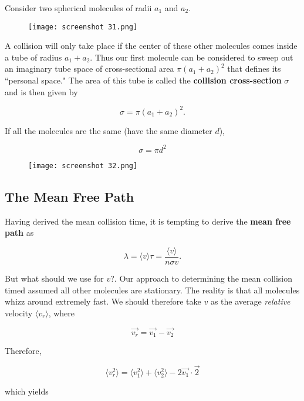 \documentclass[svgnames]{article}     %
\begin{document}
Consider two spherical molecules of radii $a_1$ and $a_2$. 

\begin{figure}[H]
  \centering
    \texttt{[image: screenshot 31.png]}
\end{figure}

A collision will only take place if the center of these other molecules comes
inside a tube of radius $a_1 + a_2$. Thus our first molecule can be considered
to sweep out an imaginary tube space of cross-sectional area $\pi(a_1+a_2)^2$
that defines its ``personal space." The area of this tube is called the
\textbf{collision cross-section} $\sigma$ and is then given by 

\[
\sigma = \pi(a_1 + a_2)^2.
\] \vspace{5px}

If all the molecules are the same (have the same diameter $d$), 

\[
\sigma = \pi d^2
\] \vspace{5px}

\begin{figure}[H]
  \centering
    \texttt{[image: screenshot 32.png]}
\end{figure}

\subsection{The Mean Free Path}

Having derived the mean collision time, it is tempting to derive the
\textbf{mean free path} as 

\[
\lambda = \langle v \rangle \tau = \frac{\langle v \rangle}{n\sigma v}. 
\] \vspace{5px}

But what should we use for $v$?. Our approach to determining the mean collision
timed assumed all other molecules are stationary. The reality is that all
molecules whizz around extremely fast. We should therefore take $v$ as the
average \textit{relative} velocity $\langle v_r \rangle$, where

\[
  \vec{v_r} = \vec{v_1} - \vec{v_2}
\] \vspace{5px}

Therefore, 

\[
\langle v_r ^2 \rangle = \langle v_1 ^2 \rangle + \langle v_2^2 \rangle
- 2\vec{v_1}\cdot \vec{2}
\] \vspace{5px}

which yields 
\end{document}
